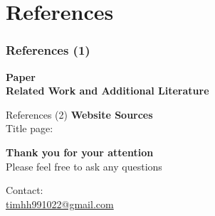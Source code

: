 \documentclass[9pt, xcolor=table]{beamer}
\makeatletter
\newcommand{\Contactmail}{\url{timhh991022@gmail.com}}
\makeatother
\begin{document}
\section{References}
%
\begin{frame}
	\frametitle{References (1)}
	\textbf{Paper}\\
	\printbibliography[keyword=inf]
	\vfill
	\textbf{Related Work and Additional Literature}
	\small
	\printbibliography[keyword=add]
\end{frame}
%
\begin{frame}{References (2)}
	\textbf{Website Sources}\\[2ex]
	\small Title page:
	\vspace{2ex}
	
	\printbibliography[keyword=web]
\end{frame}
%

%
\begin{frame}{}
	\begin{center}
		\LARGE \textbf{Thank you for your attention}\\[2ex] 
		\small Please feel free to ask any questions
		\vspace{10ex}
		
		Contact:\\
		\Contactmail
	\end{center}
\end{frame}
%
\end{document}
